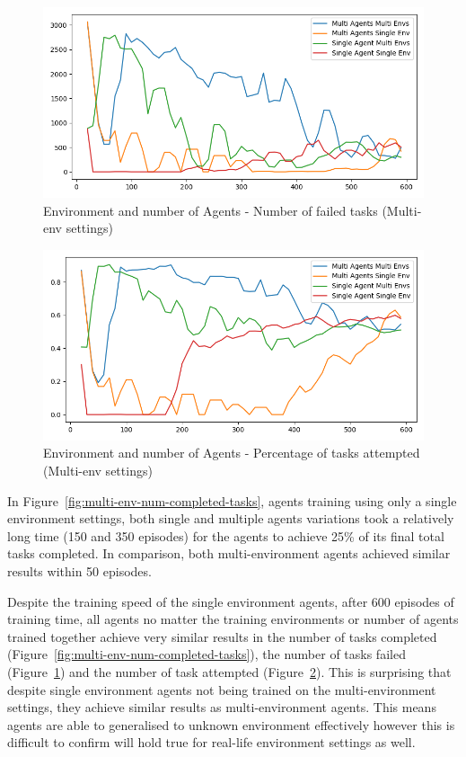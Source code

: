 \begin{figure}[H]
    \centering
    \includegraphics[width=\linewidth]{figures/5_evaluation_figs/env_agent_num_training_fig/num_failed_tasks.png}
    \caption{Environment and number of Agents - Number of failed tasks (Multi-env settings)}
    \label{fig:multi-env-num-failed-tasks}
\end{figure}

\begin{figure}[H]
    \centering
    \includegraphics[width=\linewidth]{figures/5_evaluation_figs/env_agent_num_training_fig/percent_tasks.png}
    \caption{Environment and number of Agents - Percentage of tasks attempted (Multi-env settings)}
    \label{fig:multi-env-percent-tasks}
\end{figure}

In Figure~\ref{fig:multi-env-num-completed-tasks}, agents training using only a single environment settings, both
single and multiple agents variations took a relatively long time (150 and 350 episodes) for the agents to achieve 25\%
of its final total tasks completed. In comparison, both multi-environment agents achieved similar results within 50
episodes.

Despite the training speed of the single environment agents, after 600 episodes of training time, all agents no matter
the training environments or number of agents trained together achieve very similar results in the number of tasks
completed (Figure~\ref{fig:multi-env-num-completed-tasks}), the number of tasks failed
(Figure~\ref{fig:multi-env-num-failed-tasks}) and the number of task attempted (Figure~\ref{fig:multi-env-percent-tasks}).
This is surprising that despite single environment agents not being trained on the multi-environment settings, they
achieve similar results as multi-environment agents. This means agents are able to generalised to unknown environment
effectively however this is difficult to confirm will hold true for real-life environment settings as well.

